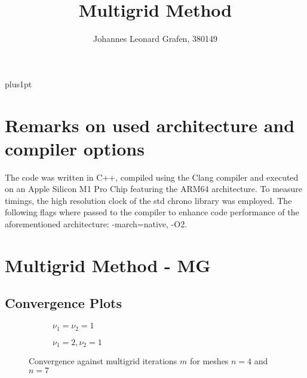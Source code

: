 \documentclass[11pt,a4paper]{article}
\title{Multigrid Method}
\author{Johannes Leonard Grafen, 380149}
\begin{document}
\renewcommand\baselinestretch{1.0}
\baselineskip=18pt plus1pt	

\maketitle
\newpage
{}
\tableofcontents
\listoffigures	%
\listoftables  %
\newpage

\section{Remarks on used architecture and compiler options}
The code was written in C++, compiled using the Clang compiler and executed on an Apple Silicon M1 Pro Chip featuring the ARM64 architecture. To measure timings, the high resolution clock of the std chrono library was employed. The following flags where passed to the compiler to enhance code performance of the aforementioned architecture: -march=native, -O2. 

\section{Multigrid Method - MG}
\label{chapter:MG}

\subsection{Convergence Plots}

\begin{figure}[h!]
	\centering
	\begin{subfigure}[h!]{.49\textwidth}
		\begin{center}
			\resizebox{0.52\width}{!}{}
			\caption{$\nu_1 = \nu_2 = 1$}
			\label{fig::Res1}
		\end{center}	
	\end{subfigure}
	\hfill
	\begin{subfigure}[h!]{.49\textwidth}
		\centering
		\resizebox{0.52\width}{!}{}
		\caption{$\nu_1 = 2,  \nu_2 = 1$}
		\label{fig::Res2}
	\end{subfigure}
	\label{fig::Res}
	\caption{Convergence against multigrid iterations $m$ for meshes $n=4$ and $n=7$ }
\end{figure}

\end{document}

